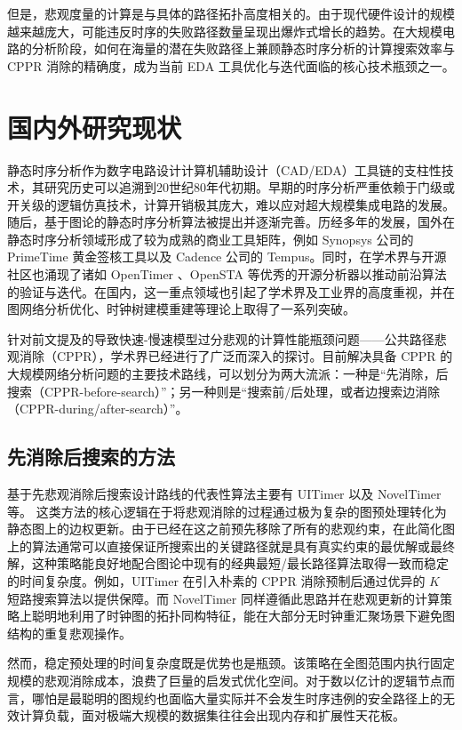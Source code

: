 但是，悲观度量的计算是与具体的路径拓扑高度相关的。由于现代硬件设计的规模越来越庞大，可能违反时序的失败路径数量呈现出爆炸式增长的趋势。在大规模电路的分析阶段，如何在海量的潜在失败路径上兼顾静态时序分析的计算搜索效率与 CPPR 消除的精确度，成为当前 EDA 工具优化与迭代面临的核心技术瓶颈之一。

\section{国内外研究现状}

静态时序分析作为数字电路设计计算机辅助设计（CAD/EDA）工具链的支柱性技术，其研究历史可以追溯到20世纪80年代初期。早期的时序分析严重依赖于门级或开关级的逻辑仿真技术，计算开销极其庞大，难以应对超大规模集成电路的发展。随后，基于图论的静态时序分析算法被提出并逐渐完善\cite{TODO_early_sta_history}。历经多年的发展，国外在静态时序分析领域形成了较为成熟的商业工具矩阵，例如 Synopsys 公司的 PrimeTime 黄金签核工具以及 Cadence 公司的 Tempus。同时，在学术界与开源社区也涌现了诸如 OpenTimer \cite{TODO_opentimer}、OpenSTA \cite{TODO_opensta} 等优秀的开源分析器以推动前沿算法的验证与迭代。在国内，这一重点领域也引起了学术界及工业界的高度重视，并在图网络分析优化、时钟树建模重建等理论上取得了一系列突破\cite{TODO_domestic_sta}。

针对前文提及的导致快速-慢速模型过分悲观的计算性能瓶颈问题——公共路径悲观消除（CPPR），学术界已经进行了广泛而深入的探讨。目前解决具备 CPPR 的大规模网络分析问题的主要技术路线，可以划分为两大流派：一种是“先消除，后搜索（CPPR-before-search）”；另一种则是“搜索前/后处理，或者边搜索边消除（CPPR-during/after-search）”。

\subsection{先消除后搜索的方法}
基于先悲观消除后搜索设计路线的代表性算法主要有 UITimer \cite{TODO_uitimer} 以及 NovelTimer \cite{TODO_noveltimer} 等。
这类方法的核⼼逻辑在于将悲观消除的过程通过极为复杂的图预处理转化为静态图上的边权更新。由于已经在这之前预先移除了所有的悲观约束，在此简化图上的算法通常可以直接保证所搜索出的关键路径就是具有真实约束的最优解或最终解，这种策略能良好地配合图论中现有的经典最短/最长路径算法取得一致而稳定的时间复杂度。例如，UITimer 在引入朴素的 CPPR 消除预制后通过优异的 $K$ 短路搜索算法以提供保障。而 NovelTimer 同样遵循此思路并在悲观更新的计算策略上聪明地利用了时钟图的拓扑同构特征，能在大部分无时钟重汇聚场景下避免图结构的重复悲观操作。

然而，稳定预处理的时间复杂度既是优势也是瓶颈。该策略在全图范围内执行固定规模的悲观消除成本，浪费了巨量的启发式优化空间。对于数以亿计的逻辑节点而言，哪怕是最聪明的图规约也面临大量实际并不会发生时序违例的安全路径上的无效计算负载，面对极端大规模的数据集往往会出现内存和扩展性天花板。

